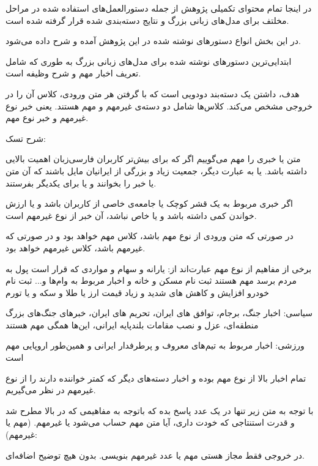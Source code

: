 
در اینجا تمام محتوای تکمیلی پژوهش از جمله دستورالعمل‌های استفاده شده در مراحل مخلتف برای مدل‌های زبانی بزرگ و نتایج دسته‌بندی شده قرار گرفته شده است.

در این بخش انواع دستورهای نوشته شده در این پژوهش آمده و شرح داده می‌شود.

ابتدایی‌ترین دستورهای نوشته شده برای مدل‌های زبانی بزرگ به طوری که شامل تعریف اخبار مهم و شرح وظیفه است.

\vspace{5pt}
\begin{scriptsize}
\begin{itshape}
    هدف، داشتن یک دسته‌بند دودویی است که با گرفتن هر متن ورودی، کلاس آن را در خروجی مشخص می‌کند. کلاس‌ها شامل دو دسته‌ی غیرمهم و مهم هستند. یعنی خبر نوع غیرمهم و خبر نوع مهم.

    شرح تسک:
    
    متن یا خبری را مهم می‌گوییم اگر که برای بیش‌تر کاربران فارسی‌زبان اهمیت بالایی داشته باشد. یا به عبارت دیگر، جمعیت زیاد و بزرگی از ایرانیان مایل باشند که آن متن یا خبر را بخوانند و یا برای یکدیگر بفرستند.
    
     اگر خبری مربوط به یک قشر کوچک یا جامعه‌ی خاصی از کاربران باشد و یا ارزش خواندن کمی داشته باشد و یا خاص نباشد، آن خبر از نوع غیرمهم است.
    
    در صورتی که متن ورودی از نوع مهم باشد، کلاس مهم خواهد بود و در صورتی که غیرمهم باشد، کلاس غیرمهم خواهد بود.
    
    برخی از مفاهیم از نوع مهم عبارت‌اند از:
    یارانه و سهام و مواردی که قرار است پول به مردم برسد مهم هستند
    ثبت نام مسکن و خانه و اخبار مربوط به وام‌ها و...
    ثبت نام خودرو
    افزایش و کاهش های شدید و زیاد قیمت ارز یا طلا و سکه و یا تورم
    
    سیاسی:
    اخبار جنگ، برجام، توافق های ایران،
    تحریم های ایران،
    خبرهای جنگ‌های بزرگ منطقه‌ای،
    عزل و نصب مقامات بلندپایه ایرانی،
    این‌ها همگی مهم هستند
    
    ورزشی:
    اخبار مربوط به تیم‌های معروف و پرطرفدار ایرانی و همین‌طور اروپایی مهم است
    
    تمام اخبار بالا از نوع مهم بوده و اخبار دسته‌های دیگر که کمتر خواننده دارند را از نوع غیرمهم در نظر می‌گیریم.
    
    با توجه به متن زیر تنها در یک عدد پاسخ بده که باتوجه به مفاهیمی که در بالا مطرح شد و قدرت استنتاجی که خودت داری، آیا متن مهم حساب می‌شود یا غیرمهم. (مهم یا غیرمهم):
    
    در خروجی فقط مجاز هستی مهم یا عدد غیرمهم بنویسی. بدون هیچ توضیح اضافه‌ای.
\end{itshape}
\end{scriptsize}
\vspace{5pt}

